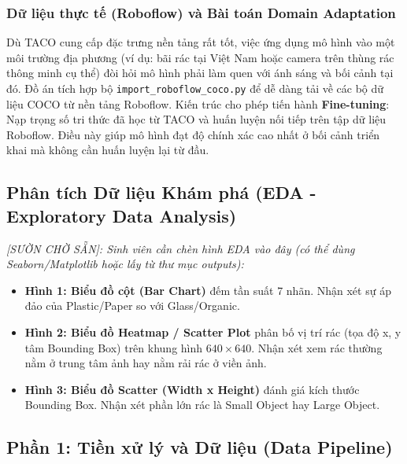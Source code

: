 \documentclass[12pt, a4paper]{article}
\begin{document}
\subsubsection{Dữ liệu thực tế (Roboflow) và Bài toán Domain Adaptation}
Dù TACO cung cấp đặc trưng nền tảng rất tốt, việc ứng dụng mô hình vào một môi trường địa phương (ví dụ: bãi rác tại Việt Nam hoặc camera trên thùng rác thông minh cụ thể) đòi hỏi mô hình phải làm quen với ánh sáng và bối cảnh tại đó.
Đồ án tích hợp bộ \texttt{import\_roboflow\_coco.py} để dễ dàng tải về các bộ dữ liệu COCO từ nền tảng Roboflow. Kiến trúc cho phép tiến hành \textbf{Fine-tuning}: Nạp trọng số tri thức đã học từ TACO và huấn luyện nối tiếp trên tập dữ liệu Roboflow. Điều này giúp mô hình đạt độ chính xác cao nhất ở bối cảnh triển khai mà không cần huấn luyện lại từ đầu.

\subsection{Phân tích Dữ liệu Khám phá (EDA - Exploratory Data Analysis)}
\begin{tcolorbox}[colback=yellow!10, colframe=red!75!black, title=YÊU CẦU BỔ SUNG ĐỂ ĐẠT 50 TRANG: BIỂU ĐỒ EDA VÀ NHẬN XÉT]
\textit{[SƯỜN CHỜ SẴN]: Sinh viên cần chèn hình EDA vào đây (có thể dùng Seaborn/Matplotlib hoặc lấy từ thư mục outputs):}
\begin{itemize}
    \item \textbf{Hình 1: Biểu đồ cột (Bar Chart)} đếm tần suất 7 nhãn. Nhận xét sự áp đảo của Plastic/Paper so với Glass/Organic.
    \item \textbf{Hình 2: Biểu đồ Heatmap / Scatter Plot} phân bố vị trí rác (tọa độ x, y tâm Bounding Box) trên khung hình $640 \times 640$. Nhận xét xem rác thường nằm ở trung tâm ảnh hay nằm rải rác ở viền ảnh.
    \item \textbf{Hình 3: Biểu đồ Scatter (Width x Height)} đánh giá kích thước Bounding Box. Nhận xét phần lớn rác là Small Object hay Large Object.
\end{itemize}
\end{tcolorbox}

\subsection{Phần 1: Tiền xử lý và Dữ liệu (Data Pipeline)}
\end{document}
